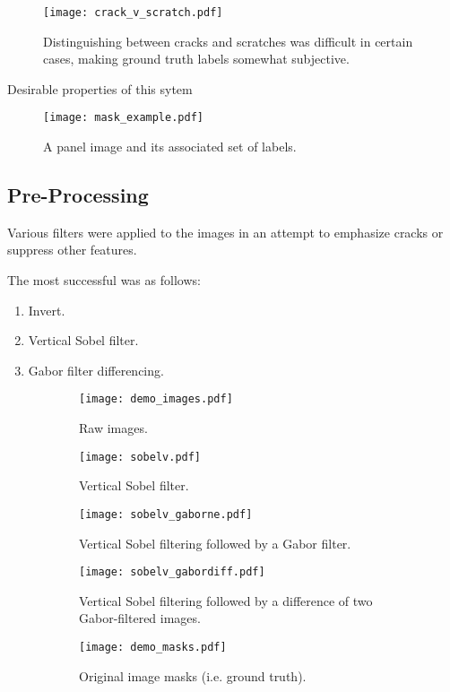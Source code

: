 \documentclass[11pt]{article} %
\begin{document}
\begin{figure}[h!]
\texttt{[image: crack\_v\_scratch.pdf]}
\caption{Distinguishing between cracks and scratches was difficult in certain cases, making ground truth labels somewhat subjective.}
\label{fig:crack_v_scratch}
\end{figure}
Desirable properties of this sytem

\begin{figure}[h!]
\texttt{[image: mask\_example.pdf]}
\caption{A panel image and its associated set of labels.}
\label{fig:mask_example}
\end{figure}

\subsection{Pre-Processing}
Various filters were applied to the images in an attempt to emphasize cracks or suppress other features.

The most successful was as follows:
\begin{enumerate}
	\item Invert.
	\item Vertical Sobel filter.
	\item Gabor filter differencing.
\end{enumerate}
\begin{figure}
\centering
  	 \begin{subfigure}[b]{1\textwidth}
   	\texttt{[image: demo\_images.pdf]}
   	\caption{Raw images.}
   	\label{fig:b} 
	\end{subfigure}

  	 \begin{subfigure}[b]{1\textwidth}
   	\texttt{[image: sobelv.pdf]}
   	\caption{Vertical Sobel filter.}
   	\label{fig:b} 
	\end{subfigure}
	
  	 \begin{subfigure}[b]{1\textwidth}
   	\texttt{[image: sobelv\_gaborne.pdf]}
   	\caption{Vertical Sobel filtering followed by a Gabor filter.}
   	\label{fig:d} 
	\end{subfigure}
	
	
  	 \begin{subfigure}[b]{1\textwidth}
   	\texttt{[image: sobelv\_gabordiff.pdf]}
   	\caption{Vertical Sobel filtering followed by a difference of two Gabor-filtered images.}
   	\label{fig:f} 
	\end{subfigure}
	
	\begin{subfigure}[b]{1\textwidth}
   	\texttt{[image: demo\_masks.pdf]}
   	\caption{Original image masks (i.e. ground truth).}
   	\label{fig:f} 
	\end{subfigure}
\caption{}
\end{figure}
\end{document}
